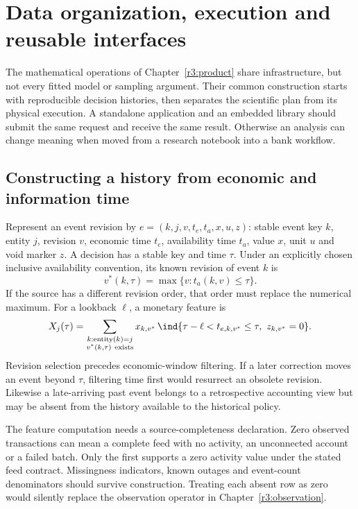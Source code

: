 \chapter{Data organization, execution and reusable interfaces}
\label{r3:construction}

The mathematical operations of Chapter~\ref{r3:product} share infrastructure,
but not every fitted model or sampling argument. Their common construction
starts with reproducible decision histories, then separates the scientific
plan from its physical execution. A standalone application and an embedded
library should submit the same request and receive the same result.
Otherwise an analysis can change meaning when moved from a research
notebook into a bank workflow.

\section{Constructing a history from economic and information time}
\label{r3:history-construction}

Represent an event revision by
$e=(k,j,v,t_e,t_a,x,u,z)$: stable event key $k$, entity $j$, revision $v$,
economic time $t_e$, availability time $t_a$, value $x$, unit $u$ and
void marker $z$. A decision has a stable key and time $\tau$.
Under an explicitly chosen inclusive availability convention, its known
revision of event $k$ is
\[
 v^*(k,\tau)=\max\{v:t_a(k,v)\le\tau\}.
\]
If the source has a different revision order, that order must replace
the numerical maximum. For a lookback $\ell$, a monetary feature is
\begin{equation}
 X_j(\tau)=
 \sum_{\substack{k:\operatorname{entity}(k)=j\\v^*(k,\tau)\ {\rm exists}}}
 x_{k,v^*}\,
 \ind\{\tau-\ell<t_{e,k,v^*}\le\tau,\ z_{k,v^*}=0\}.
 \label{r3:revision-feature}
\end{equation}
Revision selection precedes economic-window filtering. If a later
correction moves an event beyond $\tau$, filtering time first would
resurrect an obsolete revision. Likewise a late-arriving past event
belongs to a retrospective accounting view but may be absent from the
history available to the historical policy.

The feature computation needs a source-completeness declaration. Zero
observed transactions can mean a complete feed with no activity, an
unconnected account or a failed batch. Only the first supports a zero
activity value under the stated feed contract. Missingness indicators,
known outages and event-count denominators should survive construction.
Treating each absent row as zero would silently replace the observation
operator in Chapter~\ref{r3:observation}.

